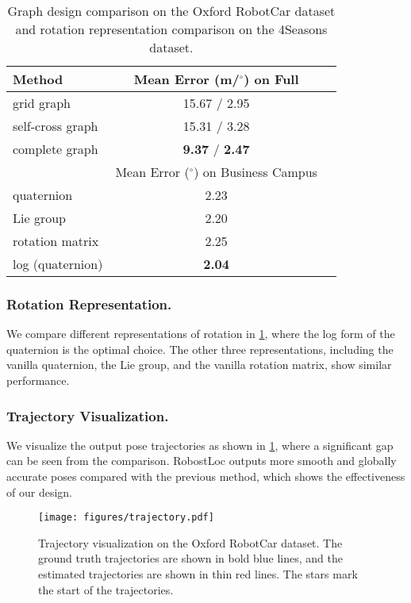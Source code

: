 \documentclass[letterpaper]{article} \usepackage{aaai23}  \usepackage{times}  \usepackage{helvet}  \usepackage{courier}  \usepackage[hyphens]{url}  \usepackage{graphicx} \urlstyle{rm} \def\UrlFont{\rm}  \usepackage{natbib}  \usepackage{caption} \frenchspacing  \setlength{\pdfpagewidth}{8.5in} \setlength{\pdfpageheight}{11in} \usepackage{booktabs}
\theoremstyle{remark}
\theoremstyle{plain}
\begin{document}
\begin{table}[!htb]\footnotesize
\centering
\begin{tabular}{l  c   c} 
\toprule
\multirow{1}{*}{Method} & \multicolumn{1}{c}{Mean Error (m/$^\circ$) on Full} \\
\midrule
grid graph & 15.67 / 2.95  \\
self-cross graph & 15.31 / 3.28  \\
complete graph & \textbf{9.37} / \textbf{2.47}  \\
\midrule
\multirow{1}{*}{} & \multicolumn{1}{c}{Mean Error ($^\circ$) on Business Campus}  \\
\midrule
quaternion & 2.23  \\
Lie group & 2.20  \\
rotation matrix & 2.25  \\
log (quaternion) & \textbf{2.04}  \\
\bottomrule
\end{tabular}
\caption{Graph design comparison on the Oxford RobotCar dataset and rotation representation comparison on the 4Seasons dataset.}
\label{tab:graph}
\end{table}


\subsubsection{Rotation Representation.}
We compare different representations of rotation in \cref{tab:graph}, where the log form of the quaternion is the optimal choice. The other three representations, including the vanilla quaternion, the Lie group, and the vanilla rotation matrix, show similar performance.





\subsubsection{Trajectory Visualization.}
We visualize the output pose trajectories as shown in \cref{fig:trajectory}, where a significant gap can be seen from the comparison. RobostLoc outputs more smooth and globally accurate poses compared with the previous method, which shows the effectiveness of our design.
\begin{figure}[!t]
\begin{center}
\texttt{[image: figures/trajectory.pdf]}
\end{center}
\caption{Trajectory visualization on the Oxford RobotCar dataset. The ground truth trajectories are shown in bold blue lines, and the estimated trajectories are shown in thin red lines. The stars mark the start of the trajectories.}
\label{fig:trajectory}
\end{figure}
\end{document}
